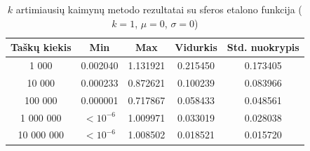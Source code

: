 \begin{table}[H]
    \centering
    \begin{tabular}{|c|c|c|c|c|}
        \hline
        \textbf{Taškų kiekis} & \textbf{Min} & \textbf{Max} & \textbf{Vidurkis} & \textbf{Std. nuokrypis} \\ \hline
        1 000        & 0.002040 & 1.131921 & 0.215450 & 0.173405 \\ \hline
        10 000       & 0.000233 & 0.872621 & 0.100239 & 0.083966 \\ \hline
        100 000      & 0.000001 & 0.717867 & 0.058433 & 0.048561 \\ \hline
        1 000 000    & $<10^{-6}$ & 1.009971 & 0.033019 & 0.028038 \\ \hline
        10 000 000   & $<10^{-6}$ & 1.008502 & 0.018521 & 0.015720 \\ \hline
    \end{tabular}
    \caption{$k$ artimiausių kaimynų metodo rezultatai su sferos etalono funkcija ($k = 1$, $\mu = 0$, $\sigma = 0$)}
\end{table}